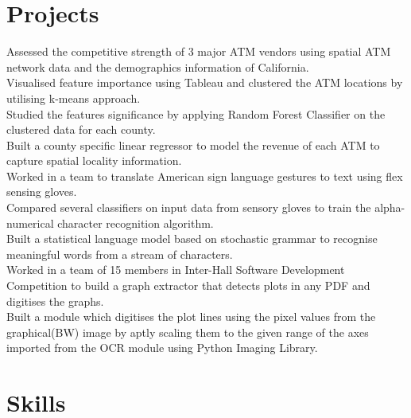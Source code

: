 \documentclass[11pt,a4paper,sans]{moderncv}        %
\begin{document}
\section{Projects}
\vspace{-1mm}
{Assessed the competitive strength of 3 major ATM vendors using spatial ATM network data and the demographics information of California. \\
Visualised feature importance using Tableau and clustered the ATM locations by utilising k-means approach. \\
Studied the features significance by applying Random Forest Classifier on the clustered data for each county. \\
Built a county specific linear regressor to model the revenue of each ATM to capture spatial locality information. \\}
\vspace{-2mm}
{Worked in a team to translate American sign language gestures to text using flex sensing gloves. \\
Compared several classifiers on input data from sensory gloves to train the alpha-numerical character recognition algorithm. \\
Built a statistical language model based on stochastic grammar to recognise meaningful words from a stream of characters. \\ }
\vspace{-2mm}
{Worked in a team of 15 members in Inter-Hall Software Development Competition to build a graph extractor that detects plots in any PDF and digitises the graphs. \\
Built a module which digitises the plot lines using the pixel values from the graphical(BW) image by aptly scaling them to the given range of the axes imported from the OCR module using Python Imaging Library. }
\vspace{-3mm}
\section{Skills}
\vspace{-1mm}
\end{document}
